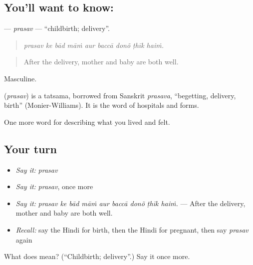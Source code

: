 \subsection*{You'll want to know: }
\textbf{} — \emph{prasav} — \textquotedblleft{}childbirth; delivery\textquotedblright{}.

\begin{quote}
        
\end{quote}

\begin{quote}
\emph{prasav ke bād māṁ aur baccā donõ ṭhīk haiṁ.}
\end{quote}

\begin{quote}
After the delivery, mother and baby are both well.
\end{quote}

Masculine.

\begin{cousinweb}
\textbf{} (\emph{prasav}) is a tatsama, borrowed from Sanskrit \emph{prasava}, \textquotedblleft{}begetting, delivery, birth\textquotedblright{} (Monier-Williams). It is the word of hospitals and forms.
\end{cousinweb}

\begin{grammarlens}[title={What you've built}]
One more word for describing what you lived and felt.
\end{grammarlens}

\subsection*{Your turn}
\begin{itemize}
\raggedright
  \item \emph{Say it:} \emph{prasav}
  \item \emph{Say it:} \emph{prasav}, once more
  \item \emph{Say it:} \emph{prasav ke bād māṁ aur baccā donõ ṭhīk haiṁ.} — After the delivery, mother and baby are both well.
  \item \emph{Recall:} say the Hindi for birth, then the Hindi for pregnant, then say \emph{prasav} again
\end{itemize}

\begin{tcolorbox}[breakable,colback=teal!4,colframe=teal!35!black,title={Before you move on}]
What does  mean? (\textquotedblleft{}Childbirth; delivery\textquotedblright{}.) Say it once more.
\end{tcolorbox}
